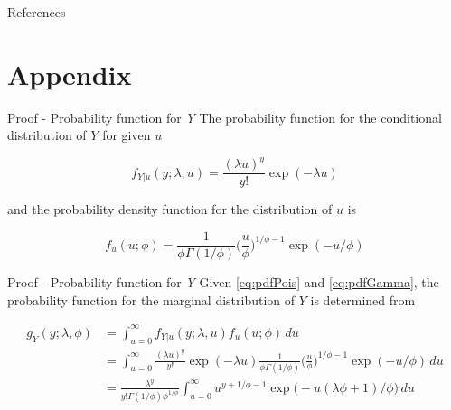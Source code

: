 \documentclass[aspectratio=169]{beamer}
\begin{document}
\begin{frame}{References}
\printbibliography[heading=none]
\end{frame}

\hypertarget{appendix}{%
\section{Appendix}\label{appendix}}

\begin{frame}{Proof - Probability function for \emph{Y}}
\protect\hypertarget{proof---probability-function-for-y}{}
The probability function for the conditional distribution of \(Y\) for
given \(u\)

\begin{equation} \label{eq:pdfPois}
  f_{Y|u}(y;\lambda, u)=\frac{(\lambda u)^y}{y!} \exp (-\lambda u)
\end{equation}

and the probability density function for the distribution of \(u\) is

\begin{equation} \label{eq:pdfGamma}
  f_{u}(u;\phi)=\frac{1}{\phi \Gamma(1/\phi)} \bigg(\frac{u}{\phi}\bigg)^{1/\phi-1} \exp (-u/\phi)
\end{equation}
\end{frame}

\begin{frame}{Proof - Probability function for \emph{Y}}
\protect\hypertarget{proof---probability-function-for-y-1}{}
Given \eqref{eq:pdfPois} and \eqref{eq:pdfGamma}, the probability
function for the marginal distribution of \(Y\) is determined from

\begin{equation} \label{eq:marMix}
  \begin{aligned}
    g_{Y}(y;\lambda,\phi)&=\int_{u=0}^\infty f_{Y|u}(y;\lambda, u) f_{u}(u;\phi) \,du \\
    &=\int_{u=0}^\infty \frac{(\lambda u)^y}{y!} \exp (-\lambda u) \frac{1}{\phi \Gamma(1/\phi)} \bigg(\frac{u}{\phi}\bigg)^{1/\phi-1} \exp (-u/\phi) \,du\\
    &=\frac{\lambda^{y}}{y!\Gamma(1/\phi)\phi^{1/\phi}} \int_{u=0}^\infty u^{y+1/\phi-1} \exp \big(-u(\lambda \phi+1)/\phi\big) \,du
  \end{aligned}
\end{equation}
\end{frame}
\end{document}
